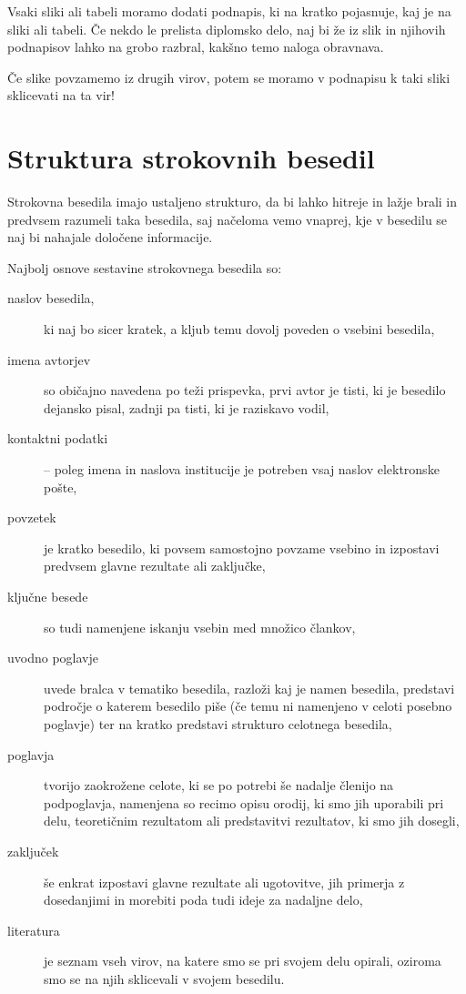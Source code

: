\documentclass[a4paper, 12pt]{book}
\begin{document}
Vsaki sliki ali tabeli moramo dodati podnapis, ki na kratko pojasnuje, kaj je na sliki ali tabeli. 
Če nekdo le prelista diplomsko delo, naj bi že iz slik in njihovih podnapisov lahko na grobo razbral, kakšno temo naloga obravnava.

Če slike povzamemo iz drugih virov, potem se moramo v podnapisu k taki sliki sklicevati na ta vir!


\chapter{Struktura strokovnih besedil}
\label{stroka}

Strokovna besedila imajo ustaljeno strukturo, da bi lahko hitreje in lažje brali in predvsem razumeli taka besedila, saj načeloma vemo vnaprej, 
kje v besedilu se naj bi nahajale določene informacije.

Najbolj osnove sestavine strokovnega besedila so:
\begin{description}
\item[naslov besedila,] ki naj bo sicer kratek, a kljub temu dovolj poveden o vsebini besedila,
\item[imena avtorjev] so običajno navedena po teži prispevka, prvi avtor je tisti, ki je besedilo dejansko pisal, zadnji pa tisti, ki je raziskavo vodil,
\item[kontaktni podatki] -- poleg imena in naslova institucije je potreben vsaj naslov elektronske pošte,
\item[povzetek] je kratko besedilo, ki povsem samostojno povzame vsebino in izpostavi predvsem  glavne rezultate ali zaključke,
\item[ključne besede] so tudi namenjene iskanju vsebin med množico člankov,
\item[uvodno poglavje] uvede bralca v tematiko besedila, razloži kaj je namen besedila, predstavi področje o katerem besedilo piše 
(če temu ni namenjeno v celoti posebno poglavje) ter na kratko predstavi strukturo celotnega besedila,
\item[poglavja] tvorijo zaokrožene celote, ki se po potrebi še nadalje členijo na podpoglavja, namenjena so recimo opisu orodij, 
ki smo jih uporabili pri delu, teoretičnim rezultatom ali predstavitvi rezultatov, ki smo jih dosegli,
\item[zaključek] še enkrat izpostavi glavne rezultate ali ugotovitve, jih primerja z dosedanjimi in morebiti poda tudi ideje za nadaljne delo,
\item[literatura] je seznam vseh virov, na katere smo se pri svojem delu opirali, oziroma smo se na njih sklicevali v svojem besedilu.
\end{description}
\end{document}
